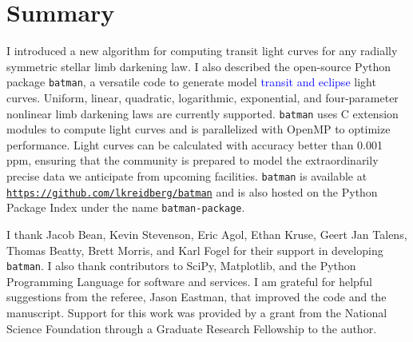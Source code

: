 \documentclass[12pt,preprint]{aastex}
\newcommand*{\blue}{\textcolor{blue}}
\begin{document}
\section{Summary}
\label{section:summary}
I introduced a new algorithm for computing transit light curves for any radially symmetric stellar limb darkening law.  I also described the open-source Python package \texttt{batman}, a versatile code to generate model \blue{transit and eclipse} light curves. Uniform, linear, quadratic, logarithmic, exponential, and four-parameter nonlinear limb darkening laws are currently supported.  \texttt{batman} uses C extension modules to compute light curves and is parallelized with OpenMP to optimize performance.  Light curves can be calculated with accuracy better than 0.001 ppm, ensuring that the community is prepared to model the extraordinarily precise data we anticipate from upcoming facilities. \texttt{batman} is available at \texttt{\blue{\url{https://github.com/lkreidberg/batman}}} and is also hosted on the Python Package Index under the name \texttt{batman-package}.

\acknowledgments
I thank Jacob Bean, Kevin Stevenson, Eric Agol, Ethan Kruse, Geert Jan Talens, Thomas Beatty, Brett Morris, and Karl Fogel for their support in developing \texttt{batman}. I also thank contributors to SciPy, Matplotlib, and the Python Programming Language for software and services.  I am grateful for helpful suggestions from the referee, Jason Eastman, that improved the code and the manuscript. Support for this work was provided by a grant from the National Science Foundation through a Graduate Research Fellowship to the author.  

%


\end{document}
